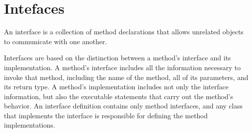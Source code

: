 \section{Intefaces}

%
An interface is a collection of method declarations 
that allows unrelated objects to communicate with one 
another. 

Interfaces are based on the distinction between a 
method’s interface and its implementation. A method’s interface 
includes all the information necessary to invoke that 
method, including the name of the method, all of its 
parameters, and its return type. A method’s 
implementation includes not only the interface 
information, but also the executable statements 
that carry out the method’s behavior. An 
interface definition contains only method 
interfaces, and any class that implements 
the interface is responsible for defining the 
method implementations.

